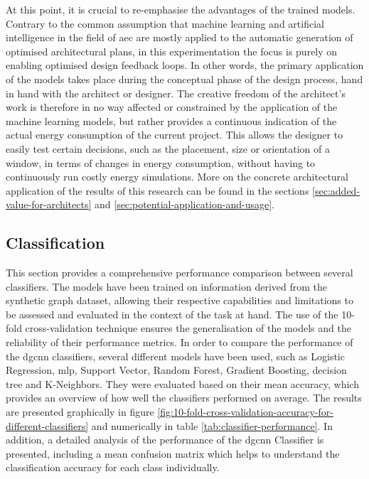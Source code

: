 \documentclass[a4paper, 12pt]{report}
\begin{document}
At this point, it is crucial to re-emphasise the advantages of the trained models. Contrary to the common assumption that machine learning and artificial intelligence in the field of \acrshort{aec} are mostly applied to the automatic generation of optimised architectural plans, in this experimentation the focus is purely on enabling optimised design feedback loops. In other words, the primary application of the models takes place during the conceptual phase of the design process, hand in hand with the architect or designer. The creative freedom of the architect's work is therefore in no way affected or constrained by the application of the machine learning models, but rather provides a continuous indication of the actual energy consumption of the current project. This allows the designer to easily test certain decisions, such as the placement, size or orientation of a window, in terms of changes in energy consumption, without having to continuously run costly energy simulations. More on the concrete architectural application of the results of this research can be found in the sections \ref{sec:added-value-for-architects} and \ref{sec:potential-application-and-usage}.

\subsection{Classification}\label{subsec:classification}

This section provides a comprehensive performance comparison between several classifiers. The models have been trained on information derived from the synthetic graph dataset, allowing their respective capabilities and limitations to be assessed and evaluated in the context of the task at hand. The use of the \gls{10-fold cross-validation} technique ensures the generalisation of the models and the reliability of their performance metrics. In order to compare the performance of the \acrshort{dgcnn} classifiers, several different models have been used, such as Logistic Regression, \acrshort{mlp}, Support Vector, Random Forest, Gradient Boosting, \Gls{decision tree} and K-Neighbors. They were evaluated based on their mean accuracy, which provides an overview of how well the classifiers performed on average. The results are presented graphically in figure \ref{fig:10-fold-cross-validation-accuracy-for-different-classifiers} and numerically in table \ref{tab:classifier-performance}. In addition, a detailed analysis of the performance of the \acrshort{dgcnn} Classifier is presented, including a mean confusion matrix which helps to understand the classification accuracy for each class individually.
\end{document}
